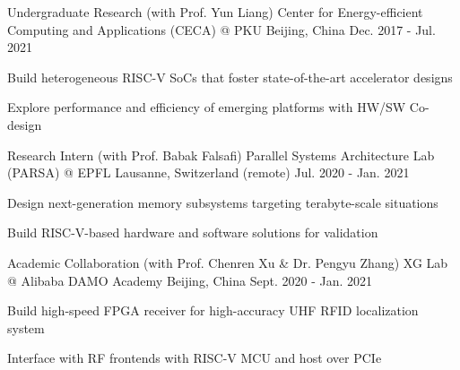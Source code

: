 

\begin{cventries}

  \cventry
    {Undergraduate Research (with Prof. Yun Liang)} %
    {Center for Energy-efficient Computing and Applications (CECA) @ PKU} %
    {Beijing, China} %
    {Dec. 2017 - Jul. 2021} %
    {
      \begin{cvitems} %
        \item {Build heterogeneous RISC-V SoCs that foster state-of-the-art accelerator designs}
        \item {Explore performance and efficiency of emerging platforms with HW/SW Co-design}
      \end{cvitems}
    }

  \cventry
    {Research Intern (with Prof. Babak Falsafi)} %
    {Parallel Systems Architecture Lab (PARSA) @ EPFL} %
    {Lausanne, Switzerland (remote)} %
    {Jul. 2020 - Jan. 2021} %
    {
      \begin{cvitems} %
        \item {Design next-generation memory subsystems targeting terabyte-scale situations}
        \item {Build RISC-V-based hardware and software solutions for validation}
      \end{cvitems}
    }

  \cventry
    {Academic Collaboration (with Prof. Chenren Xu \& Dr. Pengyu Zhang)} %
    {XG Lab @ Alibaba DAMO Academy} %
    {Beijing, China} %
    {Sept. 2020 - Jan. 2021} %
    {
      \begin{cvitems} %
        \item {Build high-speed FPGA receiver for high-accuracy UHF RFID localization system}
        \item {Interface with RF frontends with RISC-V MCU and host over PCIe}
      \end{cvitems}
    }


\end{cventries}
